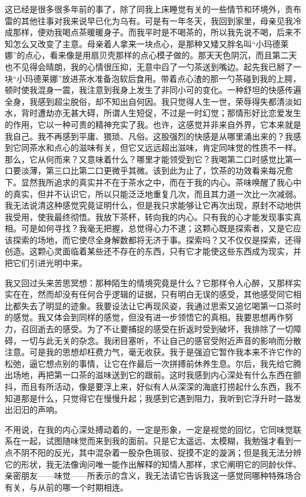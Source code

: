 \par 这已经是很多很多年前的事了，除了同我上床睡觉有关的一些情节和环境外，贡布雷的其他往事对我来说早已化为乌有。可是有一年冬天，我回到家里，母亲见我冷成那样，便劝我喝点茶暖暖身子。而我平时是不喝茶的，所以我先说不喝，后来不知怎么又改变了主意。母亲着人拿来一块点心，是那种又矮又胖名叫“小玛德莱娜”的点心，看来像是用扇贝壳那样的点心模子做的。那天天色阴沉，而且第二天也不见得会晴朗，我的心情很压抑，无意中舀了一勺茶送到嘴边。起先我已掰了一块“小玛德莱娜”放进茶水准备泡软后食用。带着点心渣的那一勺茶碰到我的上腭，顿时使我混身一震，我注意到我身上发生了非同小可的变化。一种舒坦的快感传遍全身，我感到超尘脱俗，却不知出自何因。我只觉得人生一世，荣辱得失都清淡如水，背时遭劫亦无甚大碍，所谓人生短促，不过是一时幻觉；那情形好比恋爱发生的作用，它以一种可贵的精神充实了我。也许，这感觉并非来自外界，它本来就是我自己。我不再感到平庸、猥琐、凡俗。这股强烈的快感是从哪里涌出来的？我感到它同茶水和点心的滋味有关，但它又远远超出滋味，肯定同味觉的性质不一样。那么，它从何而来？又意味着什么？哪里才能领受到它？我喝第二口时感觉比第一口要淡薄，第三口比第二口更微乎其微。该到此为止了，饮茶的功效看来每况愈下。显然我所追求的真实并不在于茶水之中，而在于我的内心。茶味唤醒了我心中的真实，但并不认识它，所以只能泛泛地重复几次，而且其力道一次比一次减弱。我无法说清这种感觉究竟证明什么，但是我只求能够让它再次出现，原封不动地供我受用，使我最终彻悟。我放下茶杯，转向我的内心。只有我的心才能发现事实真相。可是如何寻找？我毫无把握，总觉得心力不逮；这颗心既是探索者，又是它应该探索的场地，而它使尽全身解数都将无济于事。探索吗？又不仅仅是探索，还得创造。这颗心灵面临着某些还不存在的东西，只有它才能使这些东西成为现实，并把它们引进光明中来。
\par 我又回过头来苦思冥想：那种陌生的情境究竟是什么？它那样令人心醉，又那样实实在在，然而却没有任何合乎逻辑的证据，只有明白无误的感受，其他感受同它相比都失去了明显的迹象。我要设法让它再现风姿，我通过思索又追忆喝第一口茶时的感觉。我又体会到同样的感觉，但没有进一步领悟它的真相。我要思想再作努力，召回逝去的感受。为了不让要捕捉的感受在折返时受到破坏，我排除了一切障碍，一切与此无关的杂念。我闭目塞听，不让自己的感官受附近声音的影响而分散注意。可是我的思想却枉费力气，毫无收获。我于是强迫它暂作我本来不许它作的松弛，逼它想点别的事情，让它在作最后一次拼搏前休养生息。尔后，我先给它腾出场地，再把第一口茶的滋味送到它的跟前。这时我感到内心深处有什么东西在颤抖，而且有所活动，像是要浮上来，好似有人从深深的海底打捞起什么东西，我不知道那是什么，只觉得它在慢慢升起；我感到它遇到阻力，我听到它浮升时一路发出汩汩的声响。
\par 不用说，在我的内心深处搏动着的，一定是形象，一定是视觉的回忆，它同味觉联系在一起，试图随味觉而来到我的面前。只是它太遥远、太模糊，我勉强才看到一点不阴不阳的反光，其中混杂着一股杂色斑驳、捉摸不定的漩涡；但是我无法分辨它的形状，我无法像询问唯一能作出解释的知情人那样，求它阐明它的同龄伙伴、亲密朋友——味觉——所表示的含义，我无法请它告诉我这一感觉同哪种特殊场合有关，与从前的哪一个时期相连。
